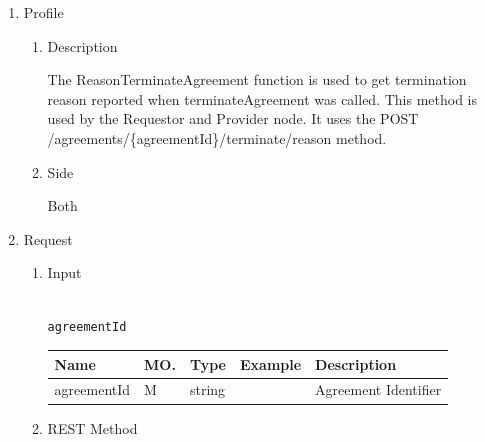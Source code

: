 \begin{enumerate}

\item Profile

\begin{enumerate}

\item Description

The ReasonTerminateAgreement function is used to get termination reason reported when terminateAgreement was called. 
This method is used by the Requestor and Provider node. It uses the POST /agreements/\{agreementId\}/terminate/reason method.

\item Side

Both

\end{enumerate}

\item Request

\begin{enumerate}

\item Input

\begin{tcolorbox}[boxrule=0pt, frame empty]
\begin{verbatim}

agreementId

\end{verbatim}
\end{tcolorbox}

%

\begin{center}
\begin{tabular}{|p{3cm}|l|p{3cm}|p{3cm}|p{4cm}|} 
\hline
\rowcolor{lightgray}	Name	& MO.	& Type	& Example & 	Description \\
\hline
agreementId		& M & 	string				&		& 	Agreement Identifier \\
\hline
\end{tabular}
\end{center}

\item REST Method

\begin{tcolorbox}[boxrule=0pt, frame empty]
\begin{verbatim} 


\end{verbatim}
\end{tcolorbox}
\end{enumerate}
\end{enumerate}
